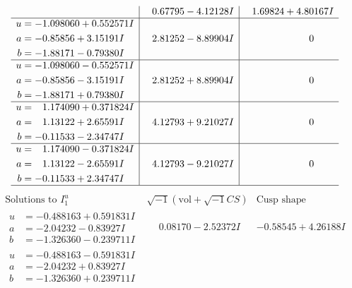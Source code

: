 \documentclass[1p]{elsarticle_modified}
\theoremstyle{definition}
\newcommand{\I}{\sqrt{-1}}
\begin{document}
$$\begin{array}{c|c|c}
 & \phantom{-}0.67795 - 4.12128 I & \phantom{-}1.69824 + 4.80167 I \\ \hline\begin{aligned}
u &= -1.098060 + 0.552571 I \\
a &= -0.85856 + 3.15191 I \\
b &= -1.88171 - 0.79380 I\end{aligned}
 & \phantom{-}2.81252 - 8.89904 I & \phantom{-0.000000 } 0 \\ \hline\begin{aligned}
u &= -1.098060 - 0.552571 I \\
a &= -0.85856 - 3.15191 I \\
b &= -1.88171 + 0.79380 I\end{aligned}
 & \phantom{-}2.81252 + 8.89904 I & \phantom{-0.000000 } 0 \\ \hline\begin{aligned}
u &= \phantom{-}1.174090 + 0.371824 I \\
a &= \phantom{-}1.13122 + 2.65591 I \\
b &= -0.11533 - 2.34747 I\end{aligned}
 & \phantom{-}4.12793 + 9.21027 I & \phantom{-0.000000 } 0 \\ \hline\begin{aligned}
u &= \phantom{-}1.174090 - 0.371824 I \\
a &= \phantom{-}1.13122 - 2.65591 I \\
b &= -0.11533 + 2.34747 I\end{aligned}
 & \phantom{-}4.12793 - 9.21027 I & \phantom{-0.000000 } 0\\
 \hline 
 \end{array}$$\newpage$$\begin{array}{c|c|c}  
\text{Solutions to }I^u_{1}& \I (\text{vol} + \sqrt{-1}CS) & \text{Cusp shape}\\
 \hline 
\begin{aligned}
u &= -0.488163 + 0.591831 I \\
a &= -2.04232 - 0.83927 I \\
b &= -1.326360 - 0.239711 I\end{aligned}
 & \phantom{-}0.08170 - 2.52372 I & -0.58545 + 4.26188 I \\ \hline\begin{aligned}
u &= -0.488163 - 0.591831 I \\
a &= -2.04232 + 0.83927 I \\
b &= -1.326360 + 0.239711 I\end{aligned}

\end{array}$$
\end{document}
